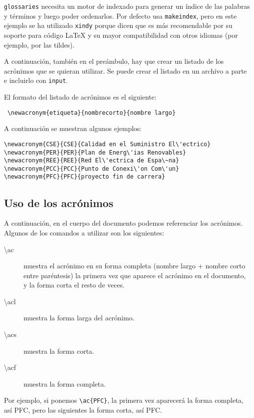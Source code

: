\documentclass[11pt]{article}
\begin{document}
\texttt{glossaries} necesita un motor de indexado para generar un \'indice de
las palabras y t\'erminos y luego poder ordenarlos. Por defecto usa
\texttt{makeindex}, pero en este ejemplo se ha utilizado \texttt{xindy} porque
dicen que es m\'as recomendable por su soporte para c\'odigo \LaTeX{} y su mayor
compatibilidad con otros idiomas (por ejemplo, por las tildes). 

A continuaci\'on, tambi\'en en el pre\'ambulo, hay que crear un listado de los
acr\'onimos que se quieran utilizar. Se puede crear el listado en un archivo a
parte e incluirlo con \texttt{input}.

El formato del listado de acr\'onimos es el siguiente:
\begin{verbatim}
 \newacronym{etiqueta}{nombrecorto}{nombre largo}
\end{verbatim}

A continuaci\'on se muestran algunos ejemplos:
\begin{lstlisting}
\newacronym{CSE}{CSE}{Calidad en el Suministro El\'ectrico}
\newacronym{PER}{PER}{Plan de Energ\'ias Renovables}
\newacronym{REE}{REE}{Red El\'ectrica de Espa\~na}
\newacronym{PCC}{PCC}{Punto de Conexi\'on Com\'un}
\newacronym{PFC}{PFC}{proyecto fin de carrera}
\end{lstlisting}

\subsection{Uso de los acr\'onimos}

A continuaci\'on, en el cuerpo del documento podemos referenciar los
acr\'onimos. Algunos de los comandos a utilizar son los siguientes:

\begin{description}
 \item [\textbackslash ac] muestra el acr\'onimo en su forma completa (nombre
largo + nombre corto entre par\'entesis) la primera vez que aparece el
acr\'onimo en el documento, y la forma corta el resto de veces.
 \item [\textbackslash acl] muestra la forma larga del acr\'onimo.
 \item [\textbackslash acs] muestra la forma corta.
 \item [\textbackslash acf] muestra la forma completa.
\end{description}

Por ejemplo, si ponemos \verb+\ac{PFC}+, la primera vez aparecer\'a la forma
completa, as\'i \ac{PFC}, pero las siguientes la forma corta, as\'i \ac{PFC}.
\end{document}
